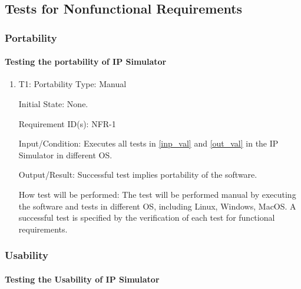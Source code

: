 \documentclass[12pt, titlepage]{article}
\begin{document}
\subsection{Tests for Nonfunctional Requirements}

\subsubsection{Portability\label{nfr1}}

\paragraph{Testing the portability of IP Simulator}

\begin{enumerate}

\item{T1: Portability}
\vspace{3mm}
\newline
Type: Manual
					
Initial State: None. 

Requirement ID(s): NFR-1					

Input/Condition: Executes all tests in \ref{inp_val} and \ref{out_val} in the IP Simulator in different OS.
					
Output/Result: Successful test implies portability of the software.

How test will be performed: The test will be performed manual by executing the software and tests in different OS, including Linux,
Windows, MacOS. A successful test is specified by the verification of
each test for functional requirements. 
				
\end{enumerate}
\subsubsection{Usability\label{nfr2}}

\paragraph{Testing the Usability of IP Simulator}
\end{document}
